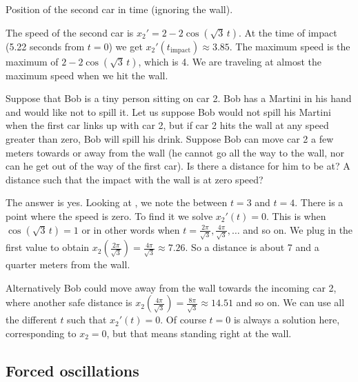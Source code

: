 \begin{example}
\begin{mywrapfig}{3.25in}
\capstart
{}
\caption{Position of the second car in time (ignoring the wall).\label{sosa:railcarfig}}
\end{mywrapfig}


The speed of the second car is $x_2' = 2 - 2 \cos ( \sqrt{3} \, t)$.
At the time of impact (5.22 seconds from $t=0$) we get 
$x_2'(t_{\text{impact}}) \approx 3.85$.
%
The maximum speed is the maximum of $2 - 2 \cos ( \sqrt{3} \, t )$, which is 4.
We are traveling at almost the maximum speed when we hit the wall.

\medskip

Suppose that Bob is a tiny person sitting on car 2.  Bob has a Martini in
his hand and would like not to spill it.  Let us suppose Bob would not spill
his Martini
when the first car links up with car 2, but if car 2 hits the wall at any
speed greater than zero, Bob will spill his drink.  Suppose Bob
can move car 2
a few meters towards or away from the wall (he cannot go all the way to the
wall, nor can he get out of the way of the first car).  Is there a
distance for him to be at?  A distance such that the impact with
the wall is at zero speed?

The answer is yes.  Looking at ,
we note the  between $t=3$ and $t=4$.  There is a point where
the speed is zero.  To find it we solve $x_2'(t) = 0$.  This is when
$\cos ( \sqrt{3} \, t) = 1$ or in other words when $t = \frac{2 \pi}{\sqrt{3}}, 
\frac{4 \pi}{\sqrt{3}},\ldots$ and so on.  We plug in the first value to obtain
$x_2\left(\frac{2 \pi}{\sqrt{3}}\right) = 
\frac{4 \pi}{\sqrt{3}} \approx 7.26$.  So a  distance is about 7 and a
quarter meters from the wall.

Alternatively Bob could move away from the wall
towards the incoming car 2, where another safe distance is
$x_2 \left( \frac{4 \pi}{\sqrt{3}} \right) = \frac{8 \pi}{\sqrt{3}}
\approx 14.51$ and so on.  We can use all the different
$t$ such that $x_2'(t) = 0$.  Of course $t=0$ is always a solution here,
corresponding to $x_2 = 0$, but
that means standing right at the wall.
\end{example}

\subsection{Forced oscillations}

